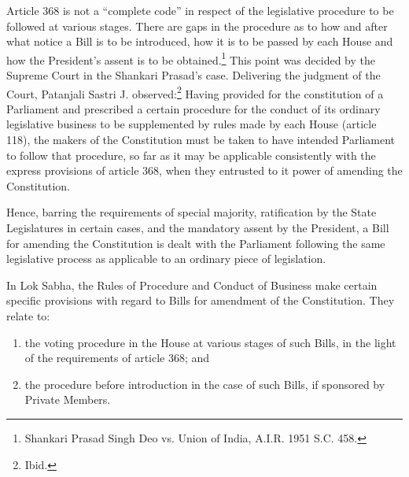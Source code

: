 \begin{multicols}{2}
\noi
Article 368 is not a “complete code” in respect of the legislative procedure to be followed at
various stages. There are gaps in the procedure as to how and after what notice a Bill is to be
introduced, how it is to be passed by each House and how the President’s assent is to be
obtained.\footnote{Shankari Prasad Singh Deo vs. Union of India, A.I.R. 1951 S.C. 458.} This point was decided by the Supreme Court in the Shankari Prasad’s case. Delivering the judgment of the Court, Patanjali Sastri J. observed:\footnote{Ibid.} Having provided for the constitution of a Parliament and prescribed a certain procedure for the conduct of its ordinary
legislative business to be supplemented by rules made by each House (article 118), the makers
of the Constitution must be taken to have intended Parliament to follow that procedure, so far
as it may be applicable consistently with the express provisions of article 368, when they
entrusted to it power of amending the Constitution.

\noi
Hence, barring the requirements of special majority, ratification by the State Legislatures in
certain cases, and the mandatory assent by the President, a Bill for amending the Constitution
is dealt with the Parliament following the same legislative process as applicable to an ordinary
piece of legislation.

\noi
In Lok Sabha, the Rules of Procedure and Conduct of Business make certain specific
provisions with regard to Bills for amendment of the Constitution. They relate to:

\vspace{-.25cm}

\begin{enumerate}[label=$(\alph*)$]
\itemsep=0pt
\item the voting procedure in the House at various stages of such Bills, in the light of the
requirements of article 368; and

\item the procedure before introduction in the case of such Bills, if sponsored by Private
Members.
\end{enumerate}

\vspace{-.25cm}


\end{multicols}
